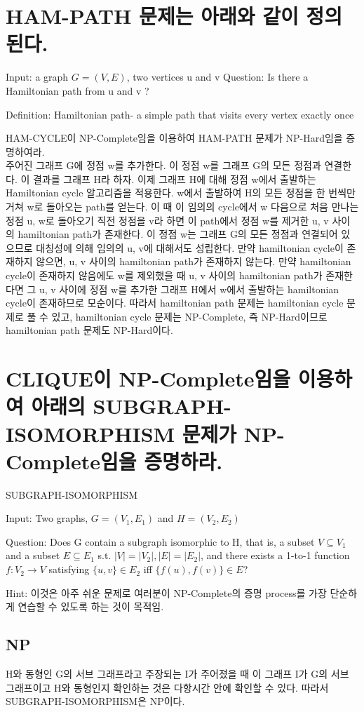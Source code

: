 \documentclass{article}
\begin{document}
\section{HAM-PATH 문제는 아래와 같이 정의된다.}

Input: a graph $G=(V, E)$, two vertices u and v
Question: Is there a Hamiltonian path from u and v ?

Definition: Hamiltonian path- a simple path that visits every vertex exactly once

HAM-CYCLE이 NP-Complete임을 이용하여 HAM-PATH 문제가 NP-Hard임을 증명하여라.
\\
 주어진 그래프 G에 정점 w를 추가한다. 이 정점 w를 그래프 G의 모든 정점과 연결한다. 이 결과를 그래프 H라 하자. 이제 그래프 H에 대해 정점 w에서 출발하는 Hamiltonian cycle 알고리즘을 적용한다. w에서 출발하여 H의 모든 정점을 한 번씩만 거쳐 w로 돌아오는 path를 얻는다. 이 때 이 임의의 cycle에서 w 다음으로 처음 만나는 정점 u, w로 돌아오기 직전 정점을 v라 하면 이 path에서 정점 w를 제거한 u, v 사이의 hamiltonian path가 존재한다. 이 정점 w는 그래프 G의 모든 정점과 연결되어 있으므로 대칭성에 의해 임의의 u, v에 대해서도 성립한다. 만약 hamiltonian cycle이 존재하지 않으면, u, v 사이의 hamiltonian path가 존재하지 않는다. 만약 hamiltonian cycle이 존재하지 않음에도 w를 제외했을 때 u, v 사이의 hamiltonian path가 존재한다면 그 u, v 사이에 정점 w를 추가한 그래프 H에서 w에서 출발하는 hamiltonian cycle이 존재하므로 모순이다.
 따라서 hamiltonian path 문제는 hamiltonian cycle 문제로 풀 수 있고, hamiltonian cycle 문제는 NP-Complete, 즉 NP-Hard이므로 hamiltonian path 문제도 NP-Hard이다.

\section{CLIQUE이 NP-Complete임을 이용하여 아래의 SUBGRAPH-ISOMORPHISM 문제가 NP-Complete임을 증명하라.}
SUBGRAPH-ISOMORPHISM

Input: Two graphs, $G=(V_1, E_1)$ and $H=(V_2, E_2)$

Question: Does G contain a subgraph isomorphic to H, that is, a subset $V \subseteq V_1$ and a subset $E \subseteq E_1$ s.t. $|V|=|V_2|, |E|=|E_2|$, and there exists a 1-to-1 function $ f : V_2 \to V$ satisfying $\{u,v\} \in E_2$ iff $\{f(u),f(v)\} \in E $?

Hint: 이것은 아주 쉬운 문제로 여러분이 NP-Complete의 증명 process를 가장 단순하게 연습할 수 있도록 하는 것이 목적임.

\subsection{NP}
H와 동형인 G의 서브 그래프라고 주장되는 I가 주어졌을 때 이 그래프 I가 G의 서브 그래프이고 H와 동형인지 확인하는 것은 다항시간 안에 확인할 수 있다. 따라서 SUBGRAPH-ISOMORPHISM은 NP이다.
\end{document}
